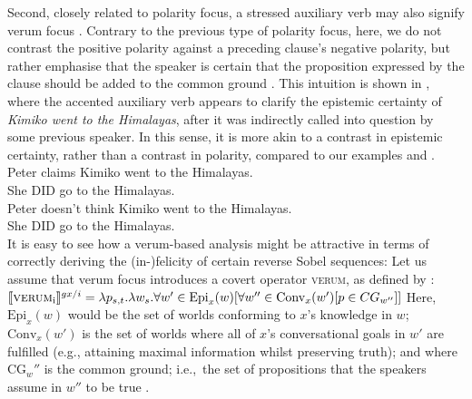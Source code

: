 Second, closely related to polarity focus, a stressed auxiliary verb may also signify verum focus \parencite{Hohle1992,Richter1993,Romero2004}. Contrary to the previous type of polarity focus, here, we do not contrast the positive polarity against a preceding clause's negative polarity, but rather emphasise that the speaker is certain that the proposition expressed by the clause should be added to the common ground \parencite{Hohle1992,Gutzmann2011,Romero2004,Romero2015,Gutzmann2020}. This intuition is shown in , where the accented auxiliary verb appears to clarify the epistemic certainty of \textit{Kimiko went to the Himalayas}, after it was indirectly called into question by some previous speaker. In this sense, it is more akin to a contrast in epistemic certainty, rather than a contrast in polarity, compared to our examples  and .
\pex{}\vspace{-9.5mm}
\a {} Peter claims Kimiko went to the Himalayas.\\
 She \MakeUppercase{did} go to the Himalayas.\\\emptyfill\parencite[adapted from][p.~630]{Romero2004}
\a {} Peter doesn't think Kimiko went to the Himalayas.\\
 She \MakeUppercase{did} go to the Himalayas.\\\emptyfill\parencite[adapted from][p.~630]{Romero2004}
\xe
It is easy to see how a verum-based analysis might be attractive in terms of correctly deriving the (in-)felicity of certain reverse Sobel sequences: Let us assume that verum focus introduces a covert operator {\scshape verum}, as defined by \textcite{Romero2004}:
\ex
$\intension[gx/i]{{\scshape verum}\textsubscript{i}} = \lambda{p_{s,t}}.\lambda{w_s}.\forall{w'\in\text{Epi}_x(w)}[\forall{w''\in\text{Conv}_x(w')}[p\in CG_{w''}]]$
\xe
Here, $\text{Epi}_x(w)$ would be the set of worlds conforming to $x$’s knowledge in $w$; $\text{Conv}_x(w')$ is the set of worlds where all of $x$'s conversational goals in $w'$ are fulfilled (e.g., attaining maximal information whilst preserving truth); and where $\text{CG}_w''$ is the common ground; i.e.,~the set of propositions that the speakers assume in $w''$ to be true \parencite{Stalnaker1978}.

